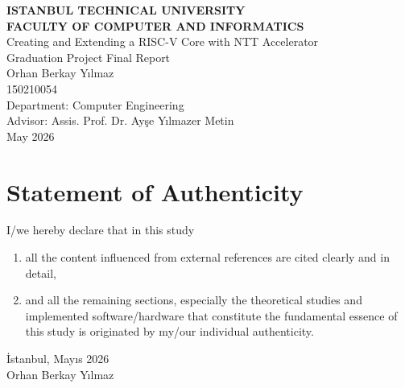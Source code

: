 \documentclass[a4paper, 12pt, titlepage]{article}
\title{\thetitle}
\author{\theauthor}
\date{\thedate}
\newcommand{\thetitle}{Creating and Extending a RISC-V Core with NTT Accelerator}
\newcommand{\theauthor}{Orhan Berkay Yılmaz}
\newcommand{\thedate}{May 2026}
\newcommand{\theturkishdate}{Mayıs 2026}
\begin{document}
\shorthandoff{=}


\begin{titlepage}
    \bfseries %
    \sffamily %
    \begin{center}
        \LARGE{\textbf{ISTANBUL TECHNICAL UNIVERSITY \\
               FACULTY OF COMPUTER AND INFORMATICS} } \\
        \vspace{5.5cm}
        \LARGE{\thetitle}  \\
        \vspace{4.5cm}
        \Large{Graduation Project Final Report} \\
        \vspace{0.5cm}
        \Large{\theauthor} \\
        \Large{150210054} \\
        \vspace{4cm}
        \large{Department: Computer Engineering} \\
        \vspace{1.5cm}
        \large{Advisor: Assis. Prof. Dr. Ayşe Yılmazer Metin} \\
        \vspace{\fill} %
        \large{\normalfont \sffamily \thedate}
    \end{center}
\end{titlepage}

\newpage
\section*{Statement of Authenticity}
I/we hereby declare that in this study
\begin{enumerate}
    \item all the content influenced from external references are cited clearly and in detail,
    \item and all the remaining sections, especially the theoretical studies and implemented software/hardware that constitute the fundamental essence of this study is originated by my/our individual authenticity.
\end{enumerate}
\vspace{1em}
İstanbul, \theturkishdate
\vspace{3em}\\ \theauthor
\end{document}

